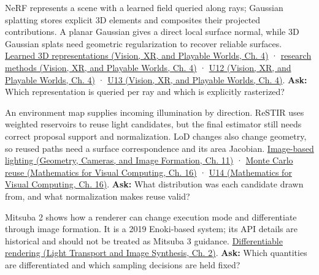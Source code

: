 NeRF represents a scene with a learned field queried along rays; Gaussian splatting stores explicit 3D elements and composites their projected contributions. A planar Gaussian gives a direct local surface normal, while 3D Gaussian splats need geometric regularization to recover reliable surfaces. \href{../07-Vision-XR-and-Playable-Worlds/main.pdf\#nameddest=04-visual-computing-ii-ch034-learned-representations-of-3d-shape-and-scenes}{Learned 3D representations (Vision, XR, and Playable Worlds, Ch. 4)} · \href{../07-Vision-XR-and-Playable-Worlds/main.pdf\#nameddest=04-visual-computing-ii-ch034-from-scene-representations-to-research-methods}{research methods (Vision, XR, and Playable Worlds, Ch. 4)} · \href{../07-Vision-XR-and-Playable-Worlds/main.pdf\#nameddest=04-visual-computing-ii-ch034-figure-u12---volume-compositing-accumulates-visible-contributions}{U12 (Vision, XR, and Playable Worlds, Ch. 4)} · \href{../07-Vision-XR-and-Playable-Worlds/main.pdf\#nameddest=04-visual-computing-ii-ch034-figure-u13---a-local-gaussian-covariance-projects-to-an-ellipse}{U13 (Vision, XR, and Playable Worlds, Ch. 4)}. \textbf{Ask:} Which representation is queried per ray and which is explicitly rasterized?

An environment map supplies incoming illumination by direction. ReSTIR uses weighted reservoirs to reuse light candidates, but the final estimator still needs correct proposal support and normalization. LoD changes also change geometry, so reused paths need a surface correspondence and its area Jacobian. \href{../03-Geometry-Cameras-and-Image-Formation/main.pdf\#nameddest=03-visual-computing-i-ch004-light-measurement-and-radiometry}{Image-based lighting (Geometry, Cameras, and Image Formation, Ch. 11)} · \href{../02-Mathematics-for-Visual-Computing/main.pdf\#nameddest=03-visual-computing-i-ch012-numerical-integration-and-monte-carlo-estimation}{Monte Carlo reuse (Mathematics for Visual Computing, Ch. 16)} · \href{../02-Mathematics-for-Visual-Computing/main.pdf\#nameddest=03-visual-computing-i-ch012-figure-u14---a-reservoir-selects-a-candidate-by-its-weight}{U14 (Mathematics for Visual Computing, Ch. 16)}. \textbf{Ask:} What distribution was each candidate drawn from, and what normalization makes reuse valid?

Mitsuba 2 shows how a renderer can change execution mode and differentiate through image formation. It is a 2019 Enoki-based system; its API details are historical and should not be treated as Mitsuba 3 guidance. \href{../04-Light-Transport-and-Image-Synthesis/main.pdf\#nameddest=03-visual-computing-i-ch007-the-rendering-equation-and-light-transport}{Differentiable rendering (Light Transport and Image Synthesis, Ch. 2)}. \textbf{Ask:} Which quantities are differentiated and which sampling decisions are held fixed?

